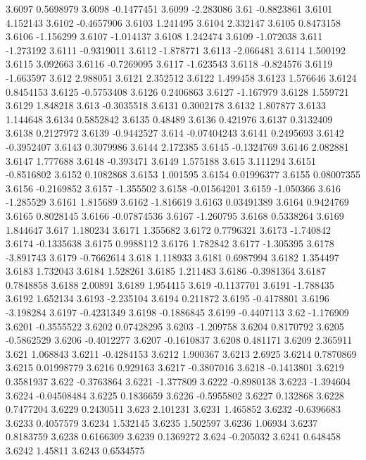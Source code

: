 3.6097  0.5698979
3.6098  -0.1477451
3.6099  -2.283086
3.61  -0.8823861
3.6101  4.152143
3.6102  -0.4657906
3.6103  1.241495
3.6104  2.332147
3.6105  0.8473158
3.6106  -1.156299
3.6107  -1.014137
3.6108  1.242474
3.6109  -1.072038
3.611  -1.273192
3.6111  -0.9319011
3.6112  -1.878771
3.6113  -2.066481
3.6114  1.500192
3.6115  3.092663
3.6116  -0.7269095
3.6117  -1.623543
3.6118  -0.824576
3.6119  -1.663597
3.612  2.988051
3.6121  2.352512
3.6122  1.499458
3.6123  1.576646
3.6124  0.8454153
3.6125  -0.5753408
3.6126  0.2406863
3.6127  -1.167979
3.6128  1.559721
3.6129  1.848218
3.613  -0.3035518
3.6131  0.3002178
3.6132  1.807877
3.6133  1.144648
3.6134  0.5852842
3.6135  0.48489
3.6136  0.421976
3.6137  0.3132409
3.6138  0.2127972
3.6139  -0.9442527
3.614  -0.07404243
3.6141  0.2495693
3.6142  -0.3952407
3.6143  0.3079986
3.6144  2.172385
3.6145  -0.1324769
3.6146  2.082881
3.6147  1.777688
3.6148  -0.393471
3.6149  1.575188
3.615  3.111294
3.6151  -0.8516802
3.6152  0.1082868
3.6153  1.001595
3.6154  0.01996377
3.6155  0.08007355
3.6156  -0.2169852
3.6157  -1.355502
3.6158  -0.01564201
3.6159  -1.050366
3.616  -1.285529
3.6161  1.815689
3.6162  -1.816619
3.6163  0.03491389
3.6164  0.9424769
3.6165  0.8028145
3.6166  -0.07874536
3.6167  -1.260795
3.6168  0.5338264
3.6169  1.844647
3.617  1.180234
3.6171  1.355682
3.6172  0.7796321
3.6173  -1.740842
3.6174  -0.1335638
3.6175  0.9988112
3.6176  1.782842
3.6177  -1.305395
3.6178  -3.891743
3.6179  -0.7662614
3.618  1.118933
3.6181  0.6987994
3.6182  1.354497
3.6183  1.732043
3.6184  1.528261
3.6185  1.211483
3.6186  -0.3981364
3.6187  0.7848858
3.6188  2.00891
3.6189  1.954415
3.619  -0.1137701
3.6191  -1.788435
3.6192  1.652134
3.6193  -2.235104
3.6194  0.211872
3.6195  -0.4178801
3.6196  -3.198284
3.6197  -0.4231349
3.6198  -0.1886845
3.6199  -0.4407113
3.62  -1.176909
3.6201  -0.3555522
3.6202  0.07428295
3.6203  -1.209758
3.6204  0.8170792
3.6205  -0.5862529
3.6206  -0.4012277
3.6207  -0.1610837
3.6208  0.481171
3.6209  2.365911
3.621  1.068843
3.6211  -0.4284153
3.6212  1.900367
3.6213  2.6925
3.6214  0.7870869
3.6215  0.01998779
3.6216  0.929163
3.6217  -0.3807016
3.6218  -0.1413801
3.6219  0.3581937
3.622  -0.3763864
3.6221  -1.377809
3.6222  -0.8980138
3.6223  -1.394604
3.6224  -0.04508484
3.6225  0.1836659
3.6226  -0.5955802
3.6227  0.132868
3.6228  0.7477204
3.6229  0.2430511
3.623  2.101231
3.6231  1.465852
3.6232  -0.6396683
3.6233  0.4057579
3.6234  1.532145
3.6235  1.502597
3.6236  1.06934
3.6237  0.8183759
3.6238  0.6166309
3.6239  0.1369272
3.624  -0.205032
3.6241  0.648458
3.6242  1.45811
3.6243  0.6534575
